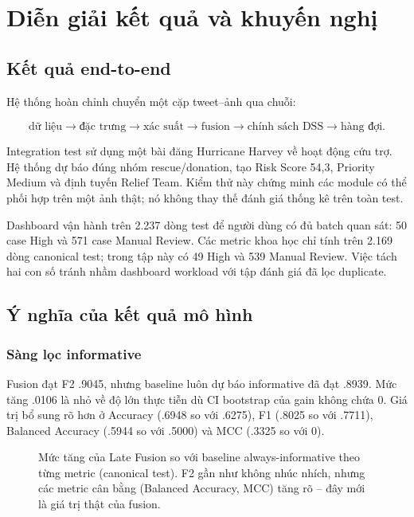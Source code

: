\chapter{Diễn giải kết quả và khuyến nghị}

\section{Kết quả end-to-end}

Hệ thống hoàn chỉnh chuyển một cặp tweet--ảnh qua chuỗi:

\[
\text{dữ liệu}\rightarrow\text{đặc trưng}\rightarrow
\text{xác suất}\rightarrow\text{fusion}\rightarrow
\text{chính sách DSS}\rightarrow\text{hàng đợi}.
\]

Integration test sử dụng một bài đăng Hurricane Harvey về hoạt động cứu trợ.
Hệ thống dự báo đúng nhóm rescue/donation, tạo Risk Score 54,3, Priority Medium
và định tuyến Relief Team. Kiểm thử này chứng minh các module có thể phối hợp
trên một ảnh thật; nó không thay thế đánh giá thống kê trên toàn test.

Dashboard vận hành trên 2.237 dòng test để người dùng có đủ batch quan sát: 50
case High và 571 case Manual Review. Các metric khoa học chỉ tính trên 2.169
dòng canonical test; trong tập này có 49 High và 539 Manual Review. Việc tách
hai con số tránh nhầm dashboard workload với tập đánh giá đã lọc duplicate.

\section{Ý nghĩa của kết quả mô hình}

\subsection{Sàng lọc informative}

Fusion đạt F2 .9045, nhưng baseline luôn dự báo informative đã đạt .8939. Mức
tăng .0106 là nhỏ về độ lớn thực tiễn dù CI bootstrap của gain không chứa 0.
Giá trị bổ sung rõ hơn ở Accuracy (.6948 so với .6275), F1 (.8025 so với
.7711), Balanced Accuracy (.5944 so với .5000) và MCC (.3325 so với 0).

\begin{figure}[H]
\centering
{}
\caption{Mức tăng của Late Fusion so với baseline always-informative theo từng
metric (canonical test). F2 gần như không nhúc nhích, nhưng các metric cân bằng
(Balanced Accuracy, MCC) tăng rõ -- đây mới là giá trị thật của fusion.}
\label{fig:informative-delta}
\end{figure}

